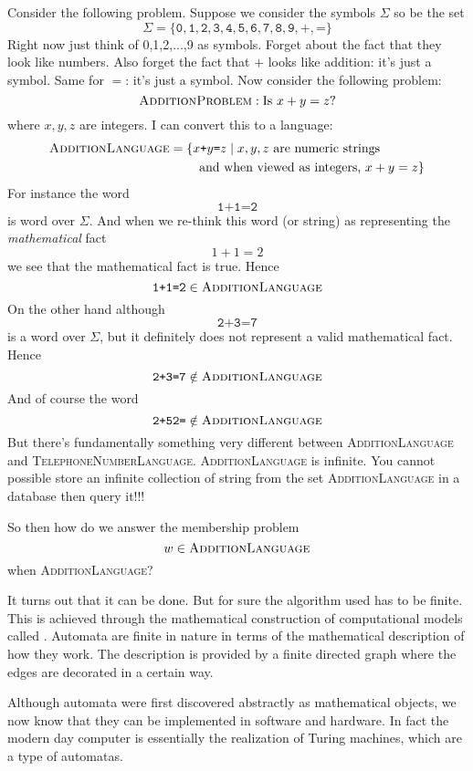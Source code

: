Consider the following problem.
Suppose we consider the symbols $\Sigma$ so be the set
\[
\Sigma = \{\texttt{0},\texttt{1},\texttt{2},\texttt{3},\texttt{4},\texttt{5},\texttt{6},\texttt{7},\texttt{8},\texttt{9},\texttt{+},\texttt{=}\}
\]
Right now just think of 0,1,2,...,9 as symbols.
Forget about the fact that they look like numbers.
Also forget the fact that $+$ looks like addition: it's just a symbol.
Same for $=$: it's just a symbol.
Now consider the following problem:
\[
\textsc{AdditionProblem}: \text{Is $x + y = z$?}
\]
where $x,y,z$ are integers.
I can convert this to a language:
\begin{align*}
  \textsc{AdditionLanguage}
  &= \{x\texttt{+}y\texttt{=}z \mid x,y,z \text{ are numeric strings} \\
  &\hspace{0.7cm}\text{ and when viewed as integers, } x + y = z \}
\end{align*}
For instance the word
\[
\texttt{1+1=2}
\]
is word over $\Sigma$. And when we re-think this word (or string) as
representing the \textit{mathematical} fact
\[
1 + 1 = 2
\]
we see that the mathematical fact is true.
Hence
\[
\texttt{1+1=2} \in \textsc{AdditionLanguage}
\]
On the other hand although
\[
\texttt{2+3=7}
\]
is a word over $\Sigma$,
but it definitely does not represent a valid mathematical fact.
Hence
\[
\texttt{2+3=7} \notin \textsc{AdditionLanguage}
\]
And of course the word
\[
\texttt{2+52=} \notin \textsc{AdditionLanguage}
\]
But there's fundamentally something very different between
\textsc{AdditionLanguage} and
\textsc{TelephoneNumberLanguage}.
\textsc{AdditionLanguage} is infinite.
You cannot possible store an infinite collection of string
from the set \textsc{AdditionLanguage} in a database then query it!!!

So then how do we answer the membership problem
\[
w \in \textsc{AdditionLanguage}
\]
when \textsc{AdditionLanguage}?

It turns out that it can be done.
But for sure the algorithm used has to be finite.
This is achieved through the mathematical construction of
computational models called .
Automata are finite in nature in terms of the mathematical
description of how they work.
The description is provided by a finite directed graph
where the edges are decorated in a certain way.

Although automata were first discovered abstractly as mathematical objects,
we now know that they can be implemented in software and hardware.
In fact the modern day computer is essentially the realization of
Turing machines, which are a type of automatas.

